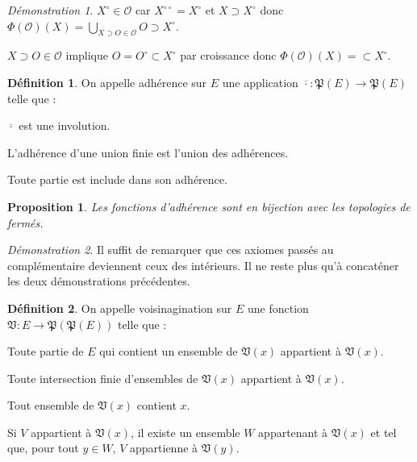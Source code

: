\documentclass[a4paper, 11pt, french]{book}
\newenvironment{itemise}{\itemize}{\enditemize}
\theoremstyle{plain} %
\newtheorem{proposition}{Proposition}
\theoremstyle{definition} %
\newtheorem{definition}{Définition}
\theoremstyle{remark} %
\newtheorem*{demonstration}{Démonstration}
\newcommand{\1}{\mathds{1}}
\begin{document}
\begin{demonstration}
\begin{itemise}
\begin{itemise}
			\begin{itemise}
				\item $X^\circ\in\mathscr{O}$ car $X^{\circ\circ}=X^\circ$ et $X\supset X^\circ$ donc $\Phi(\mathscr{O})(X)=\bigcup_{X\supset O\in\mathscr{O}}O\supset X^\circ$.
				\item $X\supset O\in\mathscr{O}$ implique $O=O^\circ\subset X^\circ$ par croissance donc $\Phi(\mathscr{O})(X)=\subset X^\circ$.
			\end{itemise}
		\end{itemise}
	\end{itemise}
\end{demonstration}

\begin{definition}
	On appelle adhérence sur $E$ une application $\overline{\cdot}\colon\mathfrak{P}(E)\rightarrow\mathfrak{P}(E)$ telle que :
	\begin{itemise}
		\item $\overline{\cdot}$ est une involution.
		\item L'adhérence d'une union finie est l'union des adhérences.
		\item Toute partie est include dans son adhérence.
	\end{itemise}
\end{definition}

\begin{proposition}
	Les fonctions d'adhérence sont en bijection avec les topologies de fermés.
\end{proposition}

\begin{demonstration}
	Il suffit de remarquer que ces axiomes passés au complémentaire deviennent ceux des intérieurs.
	Il ne reste plus qu'à concaténer les deux démonstrations précédentes.
\end{demonstration}

\begin{definition}
	On appelle voisinagination sur $E$ une fonction $\mathfrak{V}\colon E\rightarrow\mathfrak{P}(\mathfrak{P}(E))$ telle que :
	\begin{itemise}
		\item Toute partie de $E$ qui contient un ensemble de $\mathfrak{V}(x)$ appartient à $\mathfrak{V}(x)$.
		\item Toute intersection finie d'ensembles de $\mathfrak{V}(x)$ appartient à $\mathfrak{V}(x)$.
		\item Tout ensemble de $\mathfrak{V}(x)$ contient $x$.
		\item Si $V$ appartient à $\mathfrak{V}(x)$, il existe un ensemble $W$ appartenant à $\mathfrak{V}(x)$ et tel que, pour tout $y\in W$, $V$ appartienne à $\mathfrak{V}(y)$.
	\end{itemise}
\end{definition}
\end{document}
